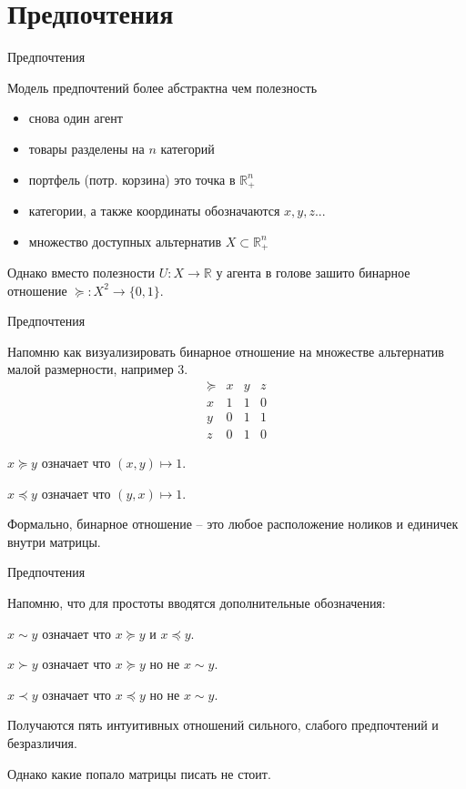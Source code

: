 \documentclass{beamer}
\begin{document}
\section{Предпочтения}

\begin{frame}{Предпочтения}

Модель предпочтений более абстрактна чем полезность

\begin{itemize}
\item снова один агент
\item товары разделены на $n$ категорий
\item портфель (потр. корзина) это точка в $\mathbb{R}_{+}^{n}$	
\item категории, а также координаты обозначаются $x, y, z...$
\item множество доступных альтернатив $X \subset \mathbb{R}_{+}^{n}$
\end{itemize}

Однако вместо полезности $U: X \to \mathbb{R}$ у агента в голове зашито бинарное отношение $\succcurlyeq: X^2 \to \{0,1\}.$

\end{frame}

\begin{frame}{Предпочтения}

Напомню как визуализировать бинарное отношение на множестве альтернатив малой размерности, например 3.
$$
\begin{array}{c|ccc}
 \succcurlyeq & x & y & z\\
\hline
x & 1 & 1 & 0 \\
y & 0 & 1 & 1\\
z & 0 & 1 & 0
\end{array}
$$

$x \succcurlyeq y$ означает что $(x,y) \mapsto 1$.

$x \preccurlyeq y$ означает что $(y,x) \mapsto 1$.

Формально, бинарное отношение – это любое расположение ноликов и единичек внутри матрицы.

\end{frame}

\begin{frame}{Предпочтения}

Напомню, что для простоты вводятся дополнительные обозначения:

$x \sim y$ означает что $x \succcurlyeq y$ и $x \preccurlyeq y$.

$x \succ y$ означает что $x \succcurlyeq y$ но не $x \sim y$.

$x \prec y$ означает что $x \preccurlyeq y$ но не $x \sim y$.

Получаются пять интуитивных отношений сильного, слабого предпочтений и безразличия.

Однако какие попало матрицы писать не стоит.

\end{frame}
\end{document}
